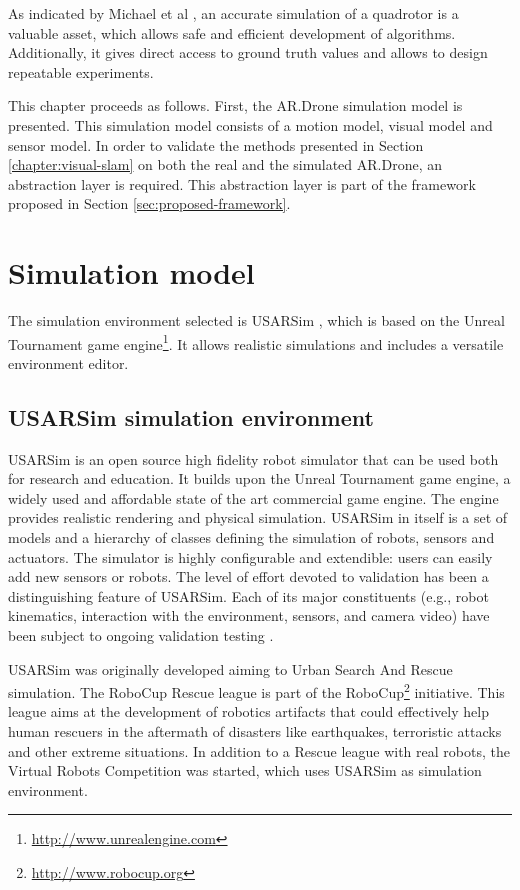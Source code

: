 As indicated by Michael et al \cite{Michael2010ra}, an accurate simulation of a quadrotor is a valuable asset, which allows safe and efficient development of %
algorithms. Additionally, it gives direct access to ground truth values and allows to design repeatable experiments.

This chapter proceeds as follows.
First, the AR.Drone simulation model is presented.
This simulation model consists of a motion model, visual model and sensor model.
In order to validate the methods presented in Section \ref{chapter:visual-slam} on both the real and the simulated AR.Drone, an abstraction layer is required.
This abstraction layer is part of the framework proposed in Section \ref{sec:proposed-framework}.

	\section{Simulation model}
The simulation environment selected is USARSim \cite{Balakirsky2009iros,carpin2007usarsim}, which is based on the Unreal Tournament game engine\footnote{\url{http://www.unrealengine.com}}.
It allows realistic simulations and includes a versatile environment editor.

		\subsection{USARSim simulation environment}
USARSim is an open source high fidelity robot simulator that can be used both for research and education.
It builds upon the Unreal Tournament game engine, a widely used and affordable state of the art commercial game engine.
The engine provides realistic rendering and physical simulation.
USARSim in itself is a set of models and a hierarchy of classes defining the simulation of robots, sensors and actuators.
The simulator is highly configurable and extendible: users can easily add new sensors or robots.
The level of effort devoted to validation has been a distinguishing feature of USARSim.
Each of its major constituents (e.g., robot kinematics, interaction with the environment, sensors, and camera video) have been subject to ongoing validation testing \cite{formsma2011realistic,carpin2006high,wang2005validating,carpin2007bridging,carpin2006quantitative}.

USARSim was originally developed aiming to Urban Search And Rescue simulation.
The RoboCup Rescue league is part of the RoboCup\footnote{\url{http://www.robocup.org}} initiative.
This league aims at the development of robotics artifacts that could effectively help human rescuers in the aftermath of disasters like earthquakes, terroristic attacks and other extreme situations.
In addition to a Rescue league with real robots, the Virtual Robots Competition was started, which uses USARSim as simulation environment.

